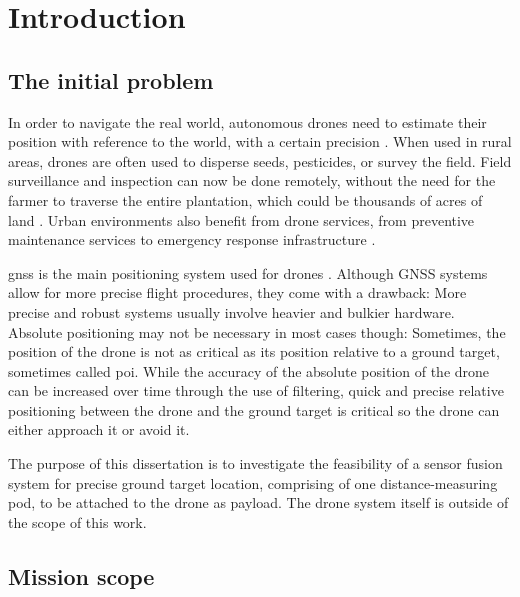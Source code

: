 \chapter{Introduction}
\label{cap:intro}

\section{The initial problem}

In order to navigate the real world, autonomous drones need to estimate their position
with reference to the world, with a certain precision \cite{introLivro1}. When used in
rural areas, drones are often used to disperse seeds, pesticides, or survey the field.
Field surveillance and inspection can now be done remotely, without the need for the
farmer to traverse the entire plantation, which could be thousands of acres of land
 \cite{introArtigo1}. Urban environments also benefit from drone services, from preventive
 maintenance services \cite{droneurban1} to emergency response infrastructure \cite{droneurban2}
\cite{droneurban3}.

\gls{gnss} is the main positioning system used for drones \cite{introLivro2}. Although GNSS
systems allow for more precise flight procedures, they come with a drawback: More precise and
robust systems usually involve heavier and bulkier hardware. Absolute positioning may not be
necessary in most cases though: Sometimes, the position of the drone is not as critical as its
position relative to a ground target, sometimes called \gls{poi}. While the accuracy of
the absolute position of the drone can be increased over time through the use of filtering,
quick and precise relative positioning between the drone and the ground target is critical so
the drone can either approach it or avoid it.

The purpose of this dissertation is to investigate the feasibility of a sensor fusion system
for precise ground target location, comprising of one distance-measuring pod, to be attached
to the drone as payload. The drone system itself is outside of the scope of this work.

\section{Mission scope}

